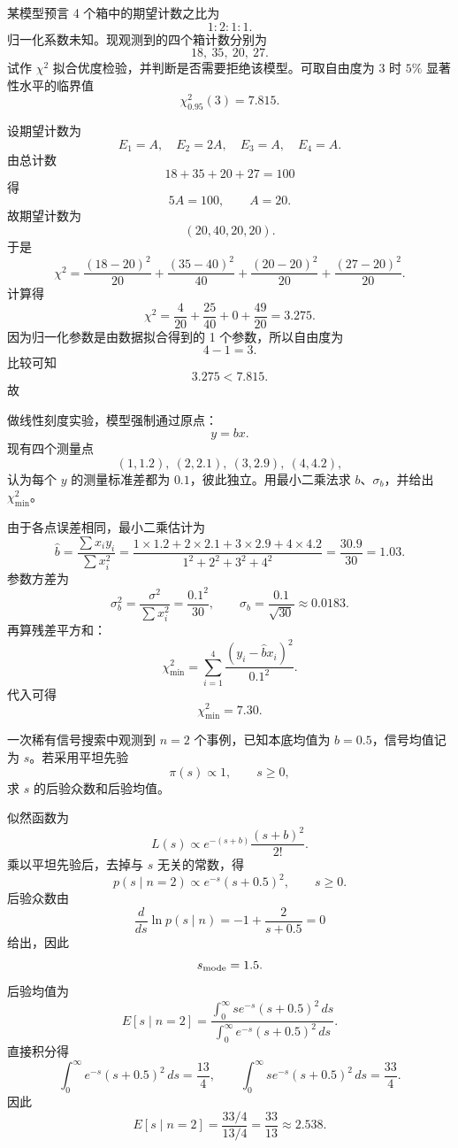 \begin{question}
某模型预言 4 个箱中的期望计数之比为
\[
1:2:1:1.
\]
归一化系数未知。现观测到的四个箱计数分别为
\[
18,\ 35,\ 20,\ 27.
\]
试作 $\chi^2$ 拟合优度检验，并判断是否需要拒绝该模型。可取自由度为 3 时 $5\%$ 显著性水平的临界值
\[
\chi^2_{0.95}(3)=7.815.
\]
\begin{solution}
设期望计数为
\[
E_1=A,\quad E_2=2A,\quad E_3=A,\quad E_4=A.
\]
由总计数
\[
18+35+20+27=100
\]
得
\[
5A=100,
\qquad A=20.
\]
故期望计数为
\[
(20,40,20,20).
\]
于是
\[
\chi^2=\frac{(18-20)^2}{20}+\frac{(35-40)^2}{40}+\frac{(20-20)^2}{20}+\frac{(27-20)^2}{20}.
\]
计算得
\[
\chi^2=\frac4{20}+\frac{25}{40}+0+\frac{49}{20}=3.275.
\]
因为归一化参数是由数据拟合得到的 1 个参数，所以自由度为
\[
4-1=3.
\]
比较可知
\[
3.275<7.815.
\]
故
\end{solution}
\end{question}

\begin{question}
做线性刻度实验，模型强制通过原点：
\[
y=bx.
\]
现有四个测量点
\[
(1,1.2),\ (2,2.1),\ (3,2.9),\ (4,4.2),
\]
认为每个 $y$ 的测量标准差都为 $0.1$，彼此独立。用最小二乘法求 $b$、$\sigma_b$，并给出 $\chi^2_{\min}$。
\begin{solution}
由于各点误差相同，最小二乘估计为
\[
\hat b=\frac{\sum x_i y_i}{\sum x_i^2}
=\frac{1\times1.2+2\times2.1+3\times2.9+4\times4.2}{1^2+2^2+3^2+4^2}
=\frac{30.9}{30}=1.03.
\]
参数方差为
\[
\sigma_b^2=\frac{\sigma^2}{\sum x_i^2}=\frac{0.1^2}{30},
\qquad
\sigma_b=\frac{0.1}{\sqrt{30}}\approx 0.0183.
\]
再算残差平方和：
\[
\chi^2_{\min}=\sum_{i=1}^4\frac{(y_i-\hat b x_i)^2}{0.1^2}.
\]
代入可得
\[
\chi^2_{\min}=7.30.
\]
\end{solution}
\end{question}

\begin{question}
一次稀有信号搜索中观测到 $n=2$ 个事例，已知本底均值为 $b=0.5$，信号均值记为 $s$。若采用平坦先验
\[
\pi(s)\propto 1,
\qquad s\ge 0,
\]
求 $s$ 的后验众数和后验均值。
\begin{solution}
似然函数为
\[
L(s)\propto e^{-(s+b)}\frac{(s+b)^2}{2!}.
\]
乘以平坦先验后，去掉与 $s$ 无关的常数，得
\[
p(s\mid n=2)\propto e^{-s}(s+0.5)^2,
\qquad s\ge 0.
\]
后验众数由
\[
\frac{d}{ds}\ln p(s\mid n)= -1+\frac{2}{s+0.5}=0
\]
给出，因此
\[
s_{\rm mode}=1.5.
\]
后验均值为
\[
E[s\mid n=2]=\frac{\int_0^{\infty} s e^{-s}(s+0.5)^2\,ds}{\int_0^{\infty} e^{-s}(s+0.5)^2\,ds}.
\]
直接积分得
\[
\int_0^{\infty} e^{-s}(s+0.5)^2\,ds=\frac{13}{4},
\qquad
\int_0^{\infty} s e^{-s}(s+0.5)^2\,ds=\frac{33}{4}.
\]
因此
\[
E[s\mid n=2]=\frac{33/4}{13/4}=\frac{33}{13}\approx 2.538.
\]
\end{solution}
\end{question}

